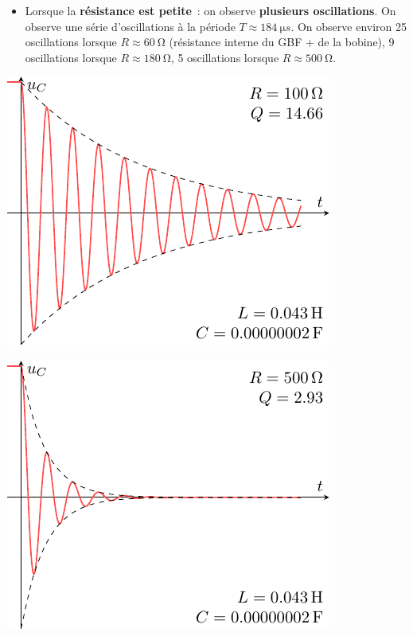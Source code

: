 \documentclass[../../main/main.tex]{subfiles}
\begin{document}
\begin{itemize}
	\item Lorsque la \textbf{résistance est petite}~: on observe \textbf{plusieurs
		      oscillations}.
	      \bigbreak
	      On observe une série d'oscillations à la période $T \approx
		      \SI{184}{\micro s}$. On observe environ 25 oscillations lorsque $R
		      \approx \SI{60}{\ohm}$ (résistance interne du GBF + de la bobine), 9
	      oscillations lorsque $R \approx \SI{180}{\ohm}$, 5 oscillations lorsque
	      $R \approx \SI{500}{\ohm}$.
\end{itemize}
\begin{minipage}{0.45\linewidth}
	\begin{center}
		\includegraphics[width=\linewidth]{carac-rlc-15}
	\end{center}
\end{minipage}
\hfill
\begin{minipage}{0.45\linewidth}
	\begin{center}
		\includegraphics[width=\linewidth]{carac-rlc-3}
	\end{center}
\end{minipage}
\end{document}
